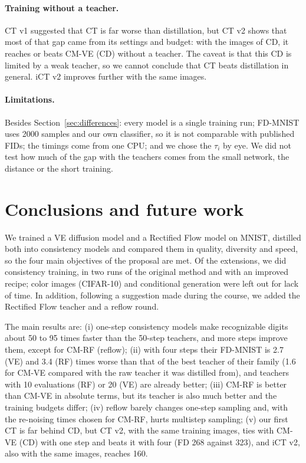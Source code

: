 \documentclass{article}
\begin{document}
\paragraph{Training without a teacher.} CT v1 suggested that CT is far worse than
distillation, but CT v2 shows that most of that gap came from its settings and
budget: with the images of CD, it reaches or beats CM-VE (CD) without a teacher.
The caveat is that this CD is limited by a weak teacher, so we cannot conclude that
CT beats distillation in general. iCT v2 improves further with the same images.

\paragraph{Limitations.} Besides Section~\ref{sec:differences}: every model is
a single training run; FD-MNIST uses 2000 samples and our own classifier, so it is
not comparable with published FIDs; the timings come from one CPU; and we chose
the $\tau_i$ by eye. We did not test how much of the gap with the teachers comes
from the small network, the distance or the short training.

\section{Conclusions and future work}
\label{sec:conclusions}

We trained a VE diffusion model and a Rectified Flow model on MNIST, distilled
both into consistency models and compared them in quality, diversity and speed,
so the four main objectives of the proposal are met. Of the extensions, we did
consistency training, in two runs of the original method and with an improved recipe; color
images (CIFAR-10) and conditional generation were left out for lack of time. In
addition, following a suggestion made during the course, we added the Rectified
Flow teacher and a reflow round.

The main results are: (i) one-step consistency models make recognizable digits
about 50 to 95 times faster than the 50-step teachers, and more steps improve
them, except for CM-RF (reflow); (ii) with four steps their FD-MNIST is 2.7 (VE) and 3.4 (RF) times
worse than that of the best teacher of their family (1.6 for CM-VE compared with
the raw teacher it was distilled from), and teachers with 10 evaluations (RF) or 20 (VE)
are already better; (iii) CM-RF is better than CM-VE in absolute terms, but its
teacher is also much better and the training budgets differ; (iv) reflow barely
changes one-step sampling and, with the re-noising times chosen for CM-RF, hurts
multistep sampling; (v) our first CT is far behind CD, but CT v2, with the same
training images, ties with CM-VE (CD) with one step and beats it with four (FD 268
against 323), and iCT v2, also with the same images, reaches 160.
\end{document}
